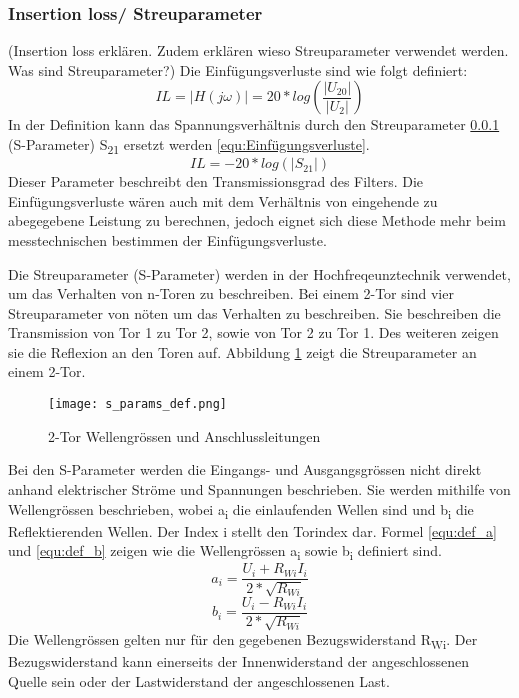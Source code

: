 \subsubsection{Insertion loss/ Streuparameter}\label{subsec:streuparam}
(Insertion loss erklären. Zudem erklären wieso Streuparameter verwendet werden. Was sind Streuparameter?)
Die Einfügungsverluste sind wie folgt definiert: 
\begin{equation}\label{equ:Freqgang}
	IL = \left\lvert H(j\omega) \right\rvert = 20*log(\frac{ \left\lvert U_{20} \right\rvert }{ \left\lvert U_2 \right\rvert })
\end{equation}
In der Definition kann das Spannungsverhältnis durch den Streuparameter \ref{subsec:streuparam} (S-Parameter) S\textsubscript{21} ersetzt werden \ref{equ:Einfügungsverluste}.
\begin{equation}\label{equ:Einfügungsverluste}
	IL = -20*log (\left\lvert S_{21} \right\rvert)
\end{equation}
 Dieser Parameter beschreibt den Transmissionsgrad des Filters. Die Einfügungsverluste wären auch mit dem Verhältnis von eingehende zu abegegebene Leistung zu berechnen, jedoch eignet sich diese Methode mehr beim messtechnischen bestimmen der Einfügungsverluste. 
 
 Die Streuparameter (S-Parameter) werden in der Hochfreqeunztechnik verwendet, um das Verhalten von n-Toren zu beschreiben. Bei einem 2-Tor sind vier Streuparameter von nöten um das Verhalten zu beschreiben. Sie beschreiben die Transmission von Tor 1 zu Tor 2, sowie von Tor 2 zu Tor 1. Des weiteren zeigen sie die Reflexion an den Toren auf. Abbildung \ref{fig:2-Tor}  zeigt die Streuparameter an einem 2-Tor. 
\begin{figure}[H]
	\centering
	\texttt{[image: s\_params\_def.png]}
	\caption{2-Tor Wellengrössen und Anschlussleitungen \cite{hftech}}
	\label{fig:2-Tor}
\end{figure}
Bei den S-Parameter werden die Eingangs- und Ausgangsgrössen nicht direkt anhand elektrischer Ströme und Spannungen beschrieben. Sie werden mithilfe von Wellengrössen beschrieben, wobei a\textsubscript{i} die einlaufenden Wellen sind und b\textsubscript{i} die Reflektierenden Wellen. Der Index i stellt den Torindex dar. Formel \ref{equ:def_a} und \ref{equ:def_b} zeigen wie die Wellengrössen a\textsubscript{i} sowie b\textsubscript{i} definiert sind.
\begin{equation}\label{equ:def_a}
	a_{ i } = \frac{ U_{ i}+R_{ Wi }I_{ i }}{2*\sqrt{ R_{ Wi } }}
\end{equation}
\begin{equation}\label{equ:def_b}
	b_{ i } = \frac{ U_{ i}-R_{ Wi }I_{ i }}{2*\sqrt{ R_{ Wi } }}
\end{equation}
Die Wellengrössen gelten nur für den gegebenen Bezugswiderstand R\textsubscript{Wi}. Der Bezugswiderstand kann einerseits der Innenwiderstand der angeschlossenen Quelle sein oder der Lastwiderstand der angeschlossenen Last.

